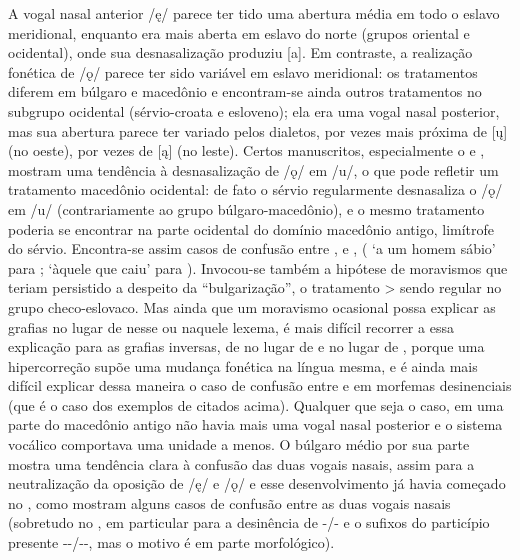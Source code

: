 A vogal nasal anterior /ę/ parece ter tido uma abertura média em todo o eslavo
meridional, enquanto era mais aberta em eslavo do norte (grupos oriental e
ocidental), onde sua desnasalização produziu [a].
Em contraste, a realização fonética de /ǫ/ parece ter sido variável em eslavo
meridional: os tratamentos diferem em búlgaro e macedônio e encontram-se ainda
outros tratamentos no subgrupo ocidental (sérvio-croata e esloveno); ela era uma
vogal nasal posterior, mas sua abertura parece ter variado pelos dialetos, por
vezes mais próxima de [ų] (no oeste), por vezes de [ą] (no leste).
Certos manuscritos, especialmente o  e
, mostram uma tendência à desnasalização de /ǫ/ em /u/, o
que pode refletir um tratamento macedônio ocidental: de fato o sérvio
regularmente desnasaliza o /ǫ/ em /u/ (contrariamente ao grupo
búlgaro\hyp{}macedônio), e o mesmo tratamento poderia se encontrar na parte ocidental
do domínio macedônio antigo, limítrofe do sérvio.
Encontra-se assim casos de confusão entre ,
 e , 
(  `a um homem sábio' 
 para ; 
 `àquele que caiu'  
para ).
Invocou-se também a hipótese de moravismos que teriam persistido a despeito da
``bulgarização'', o tratamento  >  sendo regular no grupo
checo-eslovaco.
Mas ainda que um moravismo ocasional possa explicar as grafias
 no lugar de  nesse ou naquele lexema,
é mais difícil recorrer a essa explicação para as grafias inversas, de
 no lugar de  e 
no lugar de , porque uma hipercorreção supõe uma mudança
fonética na língua mesma, e é ainda mais difícil explicar dessa maneira o caso
de confusão entre  e  em morfemas
desinenciais (que é o caso dos exemplos de  citados
acima).
Qualquer que seja o caso, em uma parte do macedônio antigo não havia mais uma
vogal nasal posterior e o sistema vocálico comportava uma unidade a menos.
O búlgaro médio por sua parte mostra uma tendência clara à confusão das duas
vogais nasais, assim para a neutralização da oposição de /ę/ e /ǫ/ e esse
desenvolvimento já havia começado no , como mostram alguns casos de
confusão entre as duas vogais nasais (sobretudo no , em
particular para a desinência de  -\slash{}- e o
sufixos do particípio presente --\slash{}--, mas o motivo
é em parte morfológico).

